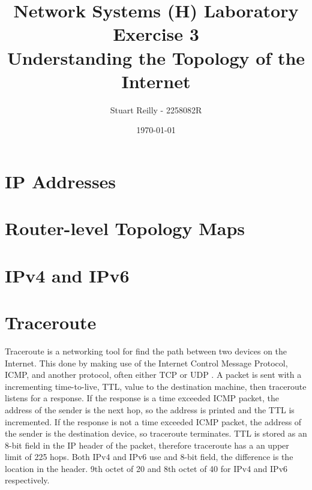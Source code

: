 \documentclass[10pt,a4paper]{article}
\begin{document}
    \title{Network Systems (H) Laboratory Exercise 3\\Understanding the Topology of the Internet}
    \author{Stuart Reilly - 2258082R}
    \date{\today}
    \maketitle

    \section{IP Addresses}\label{sec:ip-addresses}

    \section{Router-level Topology Maps}\label{sec:router-level-topology-maps}

    \section{IPv4 and IPv6}\label{sec:ipv4-and-ipv6}

    \section{Traceroute}\label{sec:traceroute}
    Traceroute is a networking tool for find the path between two devices on the Internet.
    This done by making use of the Internet Control Message Protocol, ICMP, and another protocol, often either TCP or UDP .
    A packet is sent with a incrementing time-to-live, TTL, value to the destination machine, then traceroute listens
    for a response.
    If the response is a time exceeded ICMP packet, the address of the sender is the next hop, so the address is printed
    and the TTL is incremented.
    If the response is not a time exceeded ICMP packet, the address of the sender is the destination device, so
    traceroute terminates.
    TTL is stored as an 8-bit field in the IP header of the packet, therefore traceroute has a an upper limit of 225
    hops.
    Both IPv4 and IPv6 use and 8-bit field, the difference is the location in the header.
    9th octet of 20 and 8th octet of 40 for IPv4 and IPv6 respectively.
\end{document}
